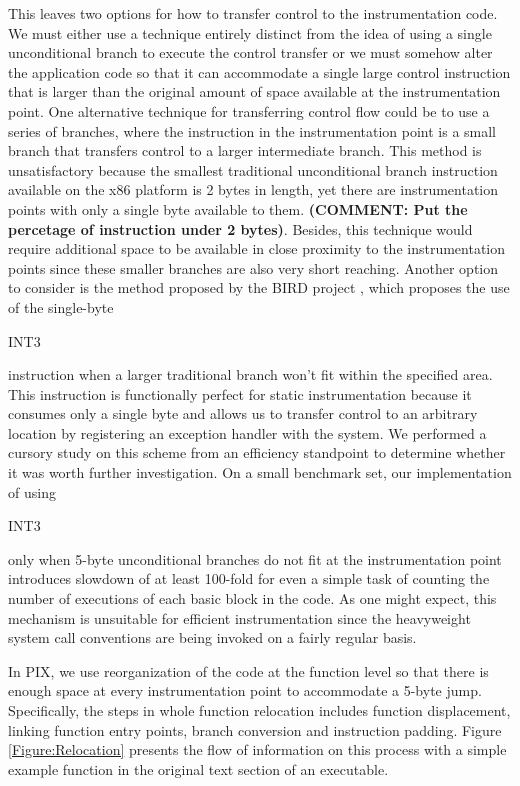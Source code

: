This leaves two options for how to transfer control to the instrumentation code.
We must either use a technique entirely distinct from the idea of using a single
unconditional branch to execute the control transfer or we must somehow alter the application code so
that it can accommodate a single large control instruction that is larger than
the original amount of space available at the instrumentation point. One alternative
technique for transferring control flow could be to use a series of branches,
where the instruction in the instrumentation point is a small branch that
transfers control to a larger intermediate branch. This
method is unsatisfactory because the smallest traditional unconditional branch instruction available
on the x86 platform is 2 bytes in length, yet there are
instrumentation points with only a single byte available to them. \textbf{(COMMENT: Put the percetage of instruction under 2 bytes)}.
Besides, this technique would
require additional space to be available in close proximity to the instrumentation points since these
smaller branches are also very short reaching. Another option
to consider is the method proposed by the BIRD project \cite{nanda2006bird}, which
proposes the use of the single-byte \begin{it}INT3\end{it} instruction when a larger traditional
branch won't fit within the specified area. This instruction is functionally
perfect for static instrumentation because it consumes only a single byte and
allows us to transfer control to an arbitrary location by registering an
exception handler with the system. We performed a cursory study on this scheme
from an efficiency standpoint to determine whether it was worth further
investigation. On a small benchmark set, our implementation of using
\begin{it}INT3\end{it} only when 5-byte unconditional branches do not fit at
the instrumentation point introduces slowdown of at least 100-fold for
even a simple task of counting the number of executions of each basic block in the code. As one might
expect, this mechanism is unsuitable for efficient instrumentation since the
 heavyweight system call conventions are being invoked on a fairly regular basis.

In PIX, we use reorganization of the code at the function level so that
there is enough space at every instrumentation point to accommodate a 5-byte
jump. Specifically, the steps in whole function relocation includes function displacement, linking function entry points,
branch conversion and instruction padding. Figure \ref{Figure:Relocation} presents the flow of information on 
this process with a simple example function in the original text section of an executable.

